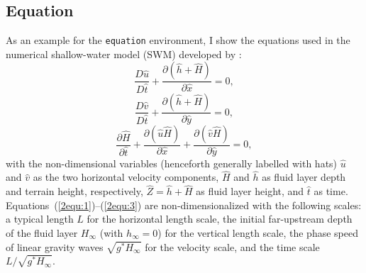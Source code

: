 \subsection{Equation}
As an example for the \verb|equation| environment, I show the equations used in
the numerical shallow-water model (SWM) developed by
\citet{scha93Aag,scha93Bag}:
\begin{equation}
\frac{D\hat{u}}{D\hat{t}}+\frac{\partial(\hat{h}+\hat{H})}
                               {\partial\hat{x}}=0,
\label{2equ:1}
\end{equation}
\begin{equation}
\frac{D\hat{v}}{D\hat{t}}+\frac{\partial(\hat{h}+\hat{H})}
                               {\partial\hat{y}}=0,
\label{2equ:2}
\end{equation}
\begin{equation}
\frac{\partial\hat{H}}{\partial\hat{t}}+\frac{\partial(\hat{u}\hat{H})}
                                             {\partial\hat{x}}
                                       +\frac{\partial(\hat{v}\hat{H})}
                                             {\partial\hat{y}}
                                                =0,
\label{2equ:3}
\end{equation}
with the non-dimensional variables (henceforth generally labelled with hats)
$\hat{u}$ and $\hat{v}$ as the two horizontal velocity components, $\hat{H}$ and
$\hat{h}$ as fluid layer depth and terrain height, respectively,
$\hat{Z}=\hat{h}+\hat{H}$ as fluid layer height, and $\hat{t}$ as time.
Equations~(\ref{2equ:1})--(\ref{2equ:3}) are non-dimensionalized with the
following scales: a typical length $L$ for the horizontal length scale, the
initial far-upstream depth of the fluid layer $H_{\infty}$ (with $h_{\infty}=0$)
for the vertical length scale, the phase speed of linear gravity waves
$\sqrt{g^*H_{\infty}}$ for the velocity scale, and the time scale
$L/\sqrt{g^*H_{\infty}}$.

